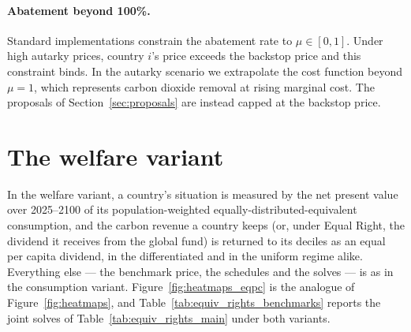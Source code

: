 \documentclass[12pt,english]{article}
\theoremstyle{remark}
\begin{document}
\paragraph{Abatement beyond 100\%.} Standard implementations constrain the abatement rate to $\mu\in[0,1]$. Under high autarky prices, country $i$'s price exceeds the backstop price and this constraint binds. In the autarky scenario we extrapolate the cost function beyond $\mu=1$, which represents carbon dioxide removal at rising marginal cost. The proposals of Section~\ref{sec:proposals} are instead capped at the backstop price.



\clearpage
\section{The welfare variant}
\label{app:eqpc}

In the welfare variant, a country's situation is measured by the net present value over 2025--2100 of its population-weighted equally-distributed-equivalent consumption, and the carbon revenue a country keeps (or, under Equal Right, the dividend it receives from the global fund) is returned to its deciles as an equal per capita dividend, in the differentiated and in the uniform regime alike. Everything else --- the benchmark price, the schedules and the solves --- is as in the consumption variant. Figure~\ref{fig:heatmaps_eqpc} is the analogue of Figure~\ref{fig:heatmaps}, and Table~\ref{tab:equiv_rights_benchmarks} reports the joint solves of Table~\ref{tab:equiv_rights_main} under both variants.
\end{document}
